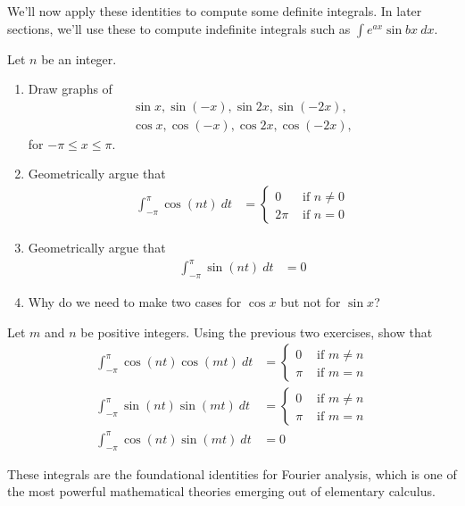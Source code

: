 We'll now apply these identities to compute some definite integrals.
In later sections, we'll use these to compute indefinite integrals  such as $\int e^{ax} \sin {bx} \: dx$.

\begin{exercise}
	Let $n$ be an integer.
	\begin{enumerate}
		\item Draw graphs of
		\begin{align*}
			\sin x, \sin (-x), \sin 2x, \sin (-2x), \\
			\cos x, \cos (-x), \cos 2x, \cos (-2x),
		\end{align*} for $ -\pi \le x \le \pi$.
		\item Geometrically argue that
		\begin{align*}
			\int_{-\pi}^{\pi} \cos (nt) \: dt &=
			\begin{cases}
				0 & \mbox{ if } n \neq 0 \\
				2 \pi & \mbox{ if } n = 0
			\end{cases}
		\end{align*}
		\item Geometrically argue that
		\begin{align*}
			\int_{-\pi}^{\pi} \sin (nt) \: dt &= 0
		\end{align*}
		\item Why do we need to make two cases for $\cos x$ but not for $\sin x$?
	\end{enumerate}
\end{exercise}

\begin{exercise}
	Let $m$ and $n$ be positive integers. Using the previous two exercises, show that
		\begin{align*}
			 \int_{-\pi}^{\pi} \cos (nt) \cos (mt) \: dt
			 &=
			 \begin{cases}
			 	0 & \mbox{ if } m \neq n \\
 			 	\pi & \mbox{ if } m = n
			 \end{cases} \\
			 \int_{-\pi}^{\pi} \sin (nt) \sin (mt) \: dt
			 &=
			 \begin{cases}
				0 & \mbox{ if } m \neq n \\
				\pi & \mbox{ if } m = n
			 \end{cases} \\
			 \int_{-\pi}^{\pi} \cos (nt) \sin (mt) \: dt
			 &=
			 0
		\end{align*}
\end{exercise}
These integrals are the foundational identities for Fourier analysis, which is one of the most powerful mathematical theories emerging out of elementary calculus.


